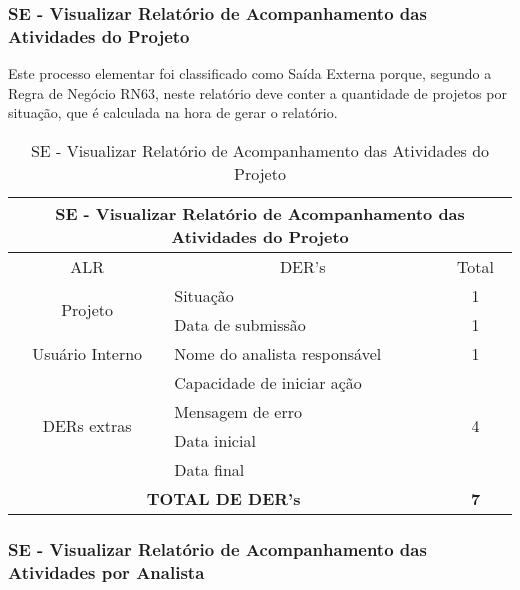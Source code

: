     \subsubsection{SE - Visualizar Relatório de Acompanhamento das Atividades do Projeto}
  
    Este processo elementar foi classificado como Saída Externa porque, segundo a Regra de Negócio RN63, neste relatório
    deve conter a quantidade de projetos por situação, que é calculada na hora de gerar o relatório.
    
      \begin{table}[!h]
      \centering
      \caption{SE - Visualizar Relatório de Acompanhamento das Atividades do Projeto}
      \label{se_visualizar_relatorio_acompanhamento}
      \begin{tabular}{|c|l|c|}
      \hline
      \multicolumn{3}{|c|}{SE - Visualizar Relatório de Acompanhamento das Atividades do Projeto} \\ \hline
      ALR                              & \multicolumn{1}{c|}{DER's}       & Total                 \\ \hline
      \multirow{2}{*}{Projeto}         & Situação                         & 1                     \\ \cline{2-3} 
				      & Data de submissão                & 1                     \\ \hline
      Usuário Interno                         & Nome do analista responsável     & 1                     \\ \hline
      \multirow{4}{*}{DERs extras}     & Capacidade de iniciar ação       & \multirow{4}{*}{4}    \\ \cline{2-2}
				      & Mensagem de erro                 &                       \\ \cline{2-2}
				      & Data inicial                     &                       \\ \cline{2-2}
				      & Data final                       &                       \\ \hline
      \multicolumn{2}{|c|}{\textbf{TOTAL DE DER's}}                       & \textbf{7}            \\ \hline
      \end{tabular}
      \end{table}
    
  \subsubsection{SE - Visualizar Relatório de Acompanhamento das Atividades por Analista}
      
